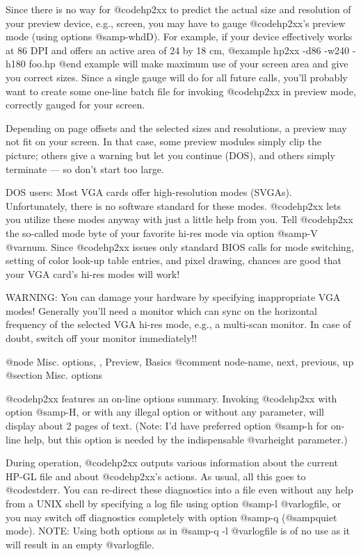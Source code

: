 Since there is no way for @code{hp2xx} to predict the actual size and
resolution of your preview device, e.g., screen, you may have to
gauge @code{hp2xx}'s preview mode (using options @samp{-whdD}). For example,
if your device effectively works at 86 DPI and offers an active area of
24 by 18 cm,
@example
hp2xx -d86 -w240 -h180 foo.hp
@end example
will make maximum use of your screen area and give you correct sizes.
Since a single gauge will do for all future calls, you'll probably want
to create some one-line batch file for invoking @code{hp2xx} in preview
mode, correctly gauged for your screen.


Depending on page offsets and the selected sizes and resolutions, a preview
may not fit on your screen. In that case, some preview modules simply
clip the picture; others give a warning but let you continue (DOS),
and others simply terminate --- so don't start too large.

DOS users: Most VGA cards offer high-resolution modes (SVGAs). Unfortunately,
there is no software standard for these modes. @code{hp2xx} lets you
utilize these modes anyway with just a little help from you.
Tell @code{hp2xx} the so-called mode byte of your favorite hi-res mode
via option @samp{-V @var{num}}. Since @code{hp2xx} issues only standard
BIOS calls for mode switching, setting of color look-up table entries,
and pixel drawing, chances are good that your VGA card's hi-res modes
will work!

WARNING: You can damage your hardware by specifying inappropriate VGA modes!
Generally you'll need a monitor which can sync on the horizontal frequency
of the selected VGA hi-res mode, e.g., a multi-scan monitor. In case of
doubt, switch off your monitor immediately!!



@node Misc. options, , Preview, Basics
@comment  node-name,  next,  previous,  up
@section Misc. options

@code{hp2xx} features an on-line options summary. Invoking @code{hp2xx}
with option @samp{-H}, or with any illegal option or without any
parameter, will display about 2 pages of text. (Note: I'd have preferred
option @samp{-h} for on-line help, but this option is needed by the
indispensable @var{height} parameter.)

During operation, @code{hp2xx} outputs various information about the current
HP-GL file and about @code{hp2xx}'s actions. As usual, all this goes to
@code{stderr}. You can re-direct these diagnostics into a file even without
any help from a UNIX shell by specifying a log file using option
@samp{-l @var{logfile}}, or you may switch off diagnostics completely
with option @samp{-q} (@samp{quiet} mode). NOTE: Using both options
as in @samp{-q -l @var{logfile}} is of no use as it will result in an
empty @var{logfile}.

